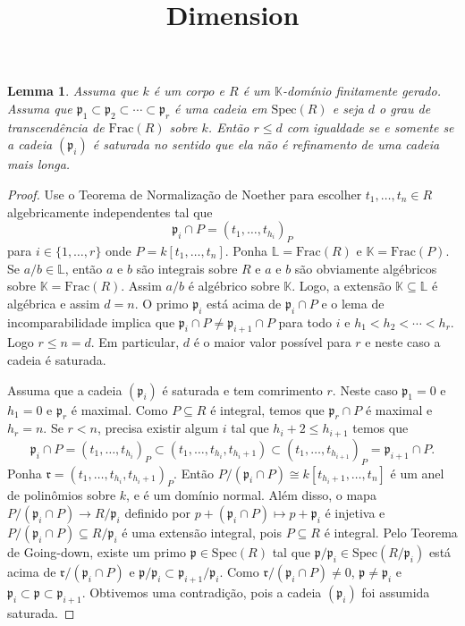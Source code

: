 \documentclass[12pt]{amsart}
\newcommand{\p}{\mathfrak p}
\renewcommand{\r}{\mathfrak r}
\renewcommand{\L}{\mathbb L}
\newcommand{\K}{\mathbb K}
\newcommand{\fracf}[1]{\mbox{Frac}(#1)}
\newcommand{\spec}[1]{\mbox{Spec}(#1)}
\newtheorem{lemma}[theorem]{Lemma}
\begin{document}
\Large
\title{Dimension}
\maketitle

\begin{lemma}
    Assuma que $k$ é um corpo e $R$ é um $\K$-domínio finitamente gerado. Assuma que 
    $\p_1\subset\p_2\subset\cdots\subset \p_r$ é uma cadeia em $\spec R$ e seja $d$ o grau de transcendência de $\fracf R$ sobre $k$. Então $r\leq d$ com igualdade se e somente se a cadeia $(\p_i)$ é saturada no sentido que ela não é refinamento de uma cadeia mais longa. 
\end{lemma}
\begin{proof}
Use o Teorema de Normalização de Noether para escolher $t_1,\ldots,t_n\in R$ algebricamente independentes tal que 
\[
    \p_i\cap P=(t_1,\ldots,t_{h_i})_P
\] 
para $i\in\{1,\ldots,r\}$ onde $P=k[t_1,\ldots,t_n]$. 
Ponha $\L=\fracf R$ e $\K=\fracf P$. Se $a/b\in\L$, então $a$ e $b$ são 
integrais sobre $R$ e $a$ e $b$ são obviamente algébricos sobre $\K=\fracf R$. Assim $a/b$ é algébrico sobre 
$\K$. Logo, a extensão $\K\subseteq \L$ é algébrica e assim 
$d=n$. O primo $\p_i$ está acima de $\p_i\cap P$ e o lema de incomparabilidade implica que 
$\p_i\cap P\neq \p_{i+1}\cap P$ para todo $i$ e $h_1<h_2<\cdots<h_r$. Logo $r\leq n=d$. 
Em particular, $d$ é o maior valor possível para $r$ e neste caso a cadeia é saturada. 

Assuma que a cadeia $(\p_i)$ é saturada e tem comrimento $r$. Neste caso $\p_1=0$ e $h_1=0$ e $\p_r$ é maximal. 
Como $P\subseteq R$ é integral, temos que $\p_r\cap P$ é maximal e $h_r=n$. 
Se $r<n$, precisa existir algum $i$ tal que $h_{i}+2\leq h_{i+1}$ temos que 
\[
    \p_i\cap P=(t_1,\ldots,t_{h_i})_P\subset (t_1,\ldots,t_{h_{i}},t_{h_i+1}) \subset 
    (t_1,\ldots,t_{h_{i+1}})_P=\p_{i+1}\cap P.
\] 
Ponha $\r= (t_1,\ldots,t_{h_{i}},t_{h_i+1})_P$. 
Então $P/(\p_i\cap P)\cong k[t_{h_i+1},\ldots,t_n]$ é um anel de polinômios sobre $k$, e 
é um domínio normal. Além disso, o mapa $P/(\p_i\cap P)\to R/\p_i$ definido por $p+(\p_i\cap P)\mapsto p+\p_i$ é injetiva e $P/(\p_i\cap P)\subseteq R/\p_i$
é uma extensão integral, pois $P\subseteq R$ é integral. Pelo Teorema de Going-down, existe 
um primo $\p\in \spec R$ tal que $\p/\p_i\in\spec {R/\p_i}$  está acima de $\r/(\p_i\cap P)$ e 
$\p/\p_i\subset \p_{i+1}/\p_i$. Como $\r/(\p_i\cap P)\neq 0$, $\p\neq \p_i$ e  $\p_i\subset \p\subset \p_{i+1}$. Obtivemos uma contradição, pois a cadeia 
$(\p_i)$ foi assumida saturada.   
\end{proof}
\end{document}
